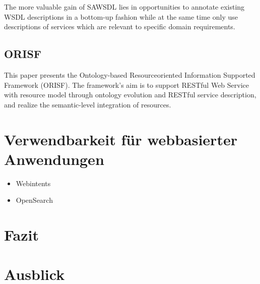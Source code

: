 \documentclass[10pt,a4paper]{article}
\begin{document}
The more valuable
gain of SAWSDL lies in opportunities to annotate existing
WSDL descriptions in a bottom-up fashion while at the
same time only use descriptions of services which are relevant
to specific domain requirements. \cite{WSMOLITE}

\subsection{ORISF}

This paper presents the Ontology-based Resourceoriented
Information Supported Framework (ORISF). The
framework’s aim is to support RESTful Web Service with
resource model through ontology evolution and RESTful
service description, and realize the semantic-level
integration of resources. \cite{zg-ontorest}

\section{Verwendbarkeit für webbasierter Anwendungen}
\label{l:verwendung}


\begin{itemize}
\item Webintents
\item OpenSearch
\end{itemize}

\section{Fazit}
\label{l:fazit}
\section{Ausblick}
\label{l:ausblick}
\pagebreak


\end{document}
